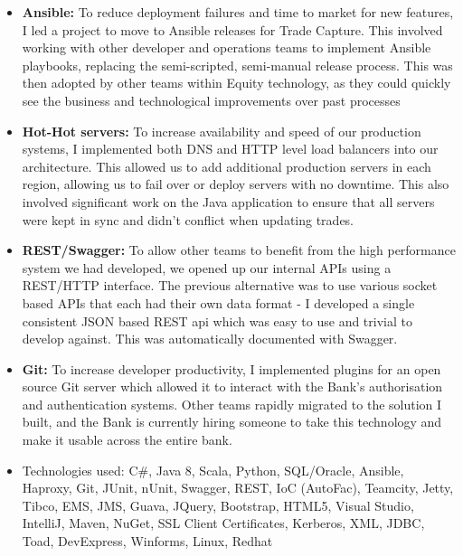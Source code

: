 \documentclass[11pt,a4paper, roman]{moderncv} %
\begin{document}
{\begin{itemize}
\item \textbf{Ansible:} To reduce deployment failures and time to market for new features, I led a project to move to Ansible releases for Trade Capture. This involved working with other developer and operations teams to implement Ansible playbooks, replacing the semi-scripted, semi-manual release process. This was then adopted by other teams within Equity technology, as they could quickly see the business and technological improvements over past processes
\item \textbf{Hot-Hot servers:} To increase availability and speed of our production systems, I implemented both DNS and HTTP level load balancers into our architecture. This allowed us to add additional production servers in each region, allowing us to fail over or deploy servers with no downtime. This also involved significant work on the Java application to ensure that all servers were kept in sync and didn't conflict when updating trades.
\item \textbf{REST/Swagger:} To allow other teams to benefit from the high performance system we had developed, we opened up our internal APIs using a REST/HTTP interface. The previous alternative was to use various socket based APIs that each had their own data format - I developed a single consistent JSON based REST api which was easy to use and trivial to develop against. This was automatically documented with Swagger.
\item \textbf{Git:} To increase developer productivity, I implemented plugins for an open source Git server which allowed it to interact with the Bank's authorisation and authentication systems. Other teams rapidly migrated to the solution I built, and the Bank is currently hiring someone to take this technology and make it usable across the entire bank.
\item {Technologies used:} C\#, Java 8, Scala, Python, SQL/Oracle, Ansible, Haproxy, Git, JUnit, nUnit, Swagger, REST, IoC (AutoFac), Teamcity, Jetty, Tibco, EMS, JMS, Guava, JQuery, Bootstrap, HTML5, Visual Studio, IntelliJ, Maven, NuGet, SSL Client Certificates, Kerberos, XML, JDBC, Toad, DevExpress, Winforms, Linux, Redhat
\end{itemize}
}
\nopagebreak
\end{document}
